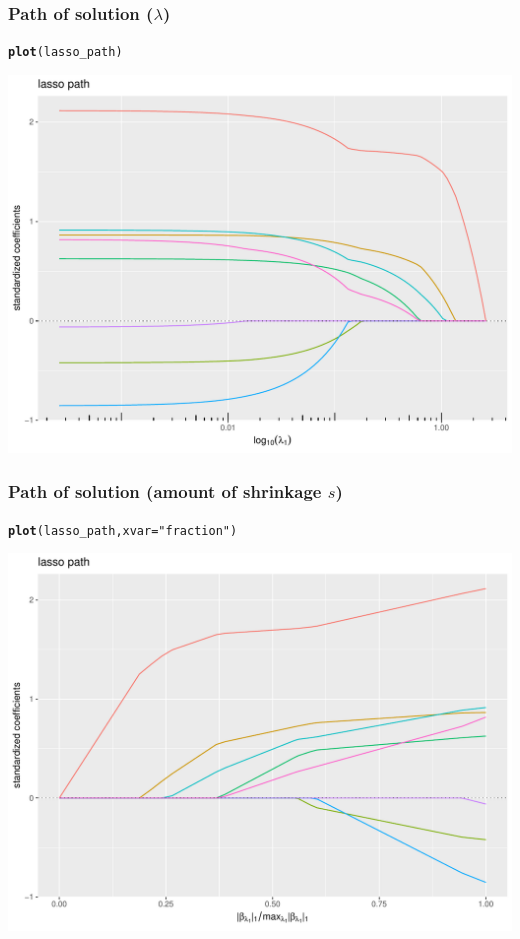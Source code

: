 \documentclass[10pt, c, xcolor=x11names]{beamer}\usepackage[]{graphicx}\usepackage[]{color}
\makeatletter
\newcommand{\hlstr}[1]{\textcolor[rgb]{0.192,0.494,0.8}{#1}}%
\newcommand{\hlstd}[1]{\textcolor[rgb]{0.345,0.345,0.345}{#1}}%
\newcommand{\hlkwc}[1]{\textcolor[rgb]{0.333,0.667,0.333}{#1}}%
\newcommand{\hlkwd}[1]{\textcolor[rgb]{0.737,0.353,0.396}{\textbf{#1}}}%
\newenvironment{kframe}{%
 \def\at@end@of@kframe{}%
 \ifinner\ifhmode%
  \def\at@end@of@kframe{\end{minipage}}%
  \begin{minipage}{\columnwidth}%
 \fi\fi%
 \def\FrameCommand##1{\hskip\@totalleftmargin \hskip-\fboxsep
 \colorbox{shadecolor}{##1}\hskip-\fboxsep
     \hskip-\linewidth \hskip-\@totalleftmargin \hskip\columnwidth}%
 \MakeFramed {\advance\hsize-\width
   \@totalleftmargin\z@ \linewidth\hsize
   \@setminipage}}%
 {\par\unskip\endMakeFramed%
 \at@end@of@kframe}
\newenvironment{knitrout}{}{} %
\makeatother
\begin{document}
\begin{frame}[containsverbatim]
  \frametitle{Path of solution ($\lambda$)}

\begin{knitrout}\scriptsize
{}\color{fgcolor}\begin{kframe}
\begin{alltt}
\hlkwd{plot}\hlstd{(lasso_path)}
\end{alltt}
\end{kframe}
\includegraphics[width=.8\textwidth]{figures/lasso_prostateunnamed-chunk-30-1} 

\end{knitrout}
\end{frame}


\begin{frame}[containsverbatim]
  \frametitle{Path of solution (amount of shrinkage $s$)}

\begin{knitrout}\scriptsize
{}\color{fgcolor}\begin{kframe}
\begin{alltt}
\hlkwd{plot}\hlstd{(lasso_path,} \hlkwc{xvar}\hlstd{=}\hlstr{"fraction"}\hlstd{)}
\end{alltt}
\end{kframe}
\includegraphics[width=.8\textwidth]{figures/lasso_prostateunnamed-chunk-31-1} 

\end{knitrout}
\end{frame}
\end{document}
